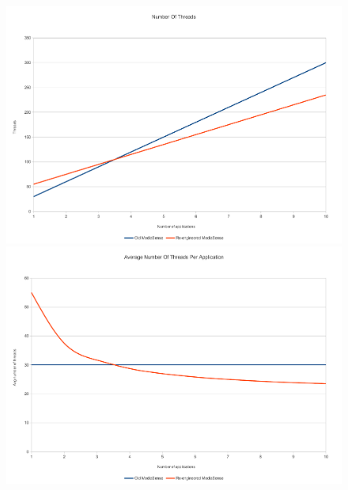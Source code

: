 \begin{figure}[H]
		\centering
    	\includegraphics[scale=0.50]{part_7/test_results/threads.pdf}
    	\includegraphics[scale=0.50]{part_7/test_results/avg_threads.pdf}
\end{figure}

\clearpage





